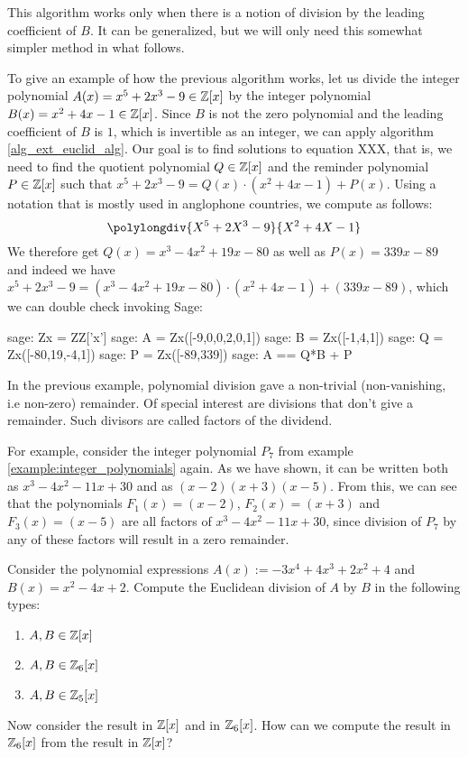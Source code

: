 This algorithm works only when there is a notion of division by the leading coefficient of $B$. It can be generalized, but we will only need this somewhat simpler method in what follows.
\begin{example} To give an example of how the previous algorithm works, let us divide the integer polynomial $A(x)=x^5+2x^3-9\in \mathbb{Z}[x]$ by the integer polynomial $B(x)=x^2+4x-1\in\mathbb{Z}[x]$. Since $B$ is not the zero polynomial and the leading coefficient of $B$ is $1$, which is invertible as an integer, we can apply algorithm \ref{alg_ext_euclid_alg}. Our goal is to find solutions to equation XXX, that is, we need to find the quotient polynomial $Q\in\mathbb{Z}[x]$ and the reminder polynomial $P \in \mathbb{Z}[x]$ such that $x^5+2x^3-9 = Q(x)\cdot (x^2+4x-1) + P(x)$. Using a notation that is mostly used in anglophone countries, we compute as follows:
\begin{equation}
\polylongdiv{X^5+2X^3-9}{X^2+4X-1}
\end{equation}
We therefore get $Q(x)=x^3-4x^2+19x-80$ as well as $P(x)=339x-89$ and indeed we have $x^5+2x^3-9 = (x^3-4x^2+19x-80)\cdot (x^2+4x-1) + (339x-89)$, which we can double check invoking Sage:
\begin{sagecommandline}
sage: Zx = ZZ['x']
sage: A = Zx([-9,0,0,2,0,1])
sage: B = Zx([-1,4,1])
sage: Q = Zx([-80,19,-4,1])
sage: P = Zx([-89,339])
sage: A == Q*B + P
\end{sagecommandline}
\end{example}
\begin{example} In the previous example, polynomial division gave a non-trivial (non-vanishing, i.e non-zero) remainder. Of special interest are divisions that don't give a remainder. Such divisors are called factors of the dividend.

For example, consider the integer polynomial $P_7$ from example \ref{example:integer_polynomials} again. As we have shown, it can be written both as $x^3 - 4 x^2 - 11 x + 30$ and as $(x-2)(x + 3)(x-5)$. From this, we can see that the polynomials $F_1(x)=(x-2)$, $F_2(x)=(x+3)$ and $F_3(x)=(x-5)$ are all factors of $x^3 - 4 x^2 - 11 x + 30$, since division of $P_7$ by any of these factors will result in a zero remainder.
\end{example}
\begin{exercise} Consider the polynomial expressions $A(x):= -3x^4 + 4x^3 + 2x^2 +4$ and $B(x)= x^2-4x+2$. Compute the Euclidean division of $A$ by $B$ in the following types:
\begin{enumerate}
\item $A,B\in \mathbb{Z}[x]$
\item $A,B\in \mathbb{Z}_6[x]$
\item $A,B\in \mathbb{Z}_5[x]$
\end{enumerate}
Now consider the result in $\mathbb{Z}[x]$ and in $\mathbb{Z}_6[x]$. How can we compute the result in $\mathbb{Z}_6[x]$ from the result in $\mathbb{Z}[x]$?
\end{exercise}
